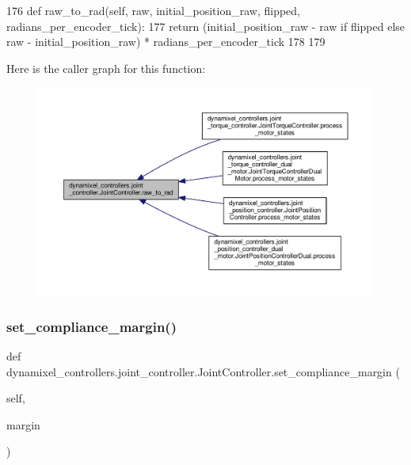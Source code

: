 \begin{DoxyCode}
176     \textcolor{keyword}{def }raw\_to\_rad(self, raw, initial\_position\_raw, flipped, radians\_per\_encoder\_tick):
177         \textcolor{keywordflow}{return} (initial\_position\_raw - raw \textcolor{keywordflow}{if} flipped \textcolor{keywordflow}{else} raw - initial\_position\_raw) * 
      radians\_per\_encoder\_tick
178 
179 \end{DoxyCode}
Here is the caller graph for this function\+:
\nopagebreak
\begin{figure}[H]
\begin{center}
\leavevmode
\includegraphics[width=350pt]{d3/dcd/classdynamixel__controllers_1_1joint__controller_1_1_joint_controller_a58a58e669c2918d00cc358f2b58d061c_icgraph}
\end{center}
\end{figure}
\mbox{\label{classdynamixel__controllers_1_1joint__controller_1_1_joint_controller_ac05dc0cc7cfeade108bec65b5937c172}} 
\subsubsection{\texorpdfstring{set\+\_\+compliance\+\_\+margin()}{set\_compliance\_margin()}}
{\footnotesize\ttfamily def dynamixel\+\_\+controllers.\+joint\+\_\+controller.\+Joint\+Controller.\+set\+\_\+compliance\+\_\+margin (\begin{DoxyParamCaption}\item[{}]{self,  }\item[{}]{margin }\end{DoxyParamCaption})}



